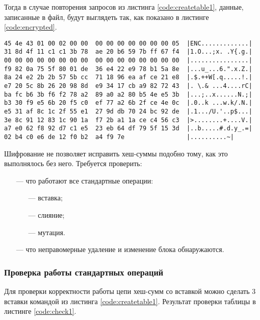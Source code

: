 Тогда в случае повторения запросов из листинга \ref{code:createtable1}, данные, записанные в файл, будут выглядеть так, как показано в листинге \ref{code:encrypted}.

\begin{lstlisting}[label=code:encrypted, caption={Данные при шифровании диска.}]
45 4e 43 01 00 02 00 00  00 00 00 00 00 00 00 05  |ENC.............|
31 8d 4f 11 c1 c1 3b 78  ae 20 b6 59 7b ff 67 f4  |1.O...;x. .Y{.g.|
00 00 00 00 00 00 00 00  00 00 00 00 00 00 00 00  |................|
f9 82 0a 75 5f 80 01 de  36 e4 22 e9 78 b1 5a 8e  |...u_...6.".x.Z.|
8a 24 e2 2b 2b 57 5b cc  71 18 96 ea af ce 21 e8  |.$.++W[.q.....!.|
e7 20 5c 8b 26 20 98 8d  e9 34 17 cb a9 82 72 43  |. \.& ...4....rC|
ba fc b6 3b f6 f2 78 a2  89 a0 a2 80 b5 4e e5 3b  |...;..x......N.;|
b3 30 f9 e5 6b 20 f5 c0  ef 77 a2 6b 2f ce 4e 0c  |.0..k ...w.k/.N.|
e5 31 af 8c 1c 2f 55 e1  27 9d db 70 24 bc 92 de  |.1.../U.'..p$...|
3e 8c 91 12 83 1c 90 1a  f7 2b a1 1a ce c4 56 c3  |>........+....V.|
a7 e0 62 f8 92 d7 c1 e5  23 eb 64 df 79 5f 15 3d  |..b.....#.d.y_.=|
02 b4 c0 e6 de 12 f0 b2  a4 f9 7e                 |..........~|
\end{lstlisting}

Шифрование не позволяет исправить хеш-суммы подобно тому, как это выполнялось без него. Требуется проверить:
\begin{itemize}
    \item [---] что работают все стандартные операции:
        \begin{itemize}
            \item [---] вставка;
            \item [---] слияние;
            \item [---] мутация.
        \end{itemize}
    \item [---] что неправомерные удаление и изменение блока обнаружаются.
\end{itemize}

\pagebreak

\subsubsection{Проверка работы стандартных операций}

Для проверки корректности работы цепи хеш-сумм со вставкой можно сделать 3 вставки командой из листинга \ref{code:createtable1}. Результат проверки таблицы в листинге \ref{code:check1}.

